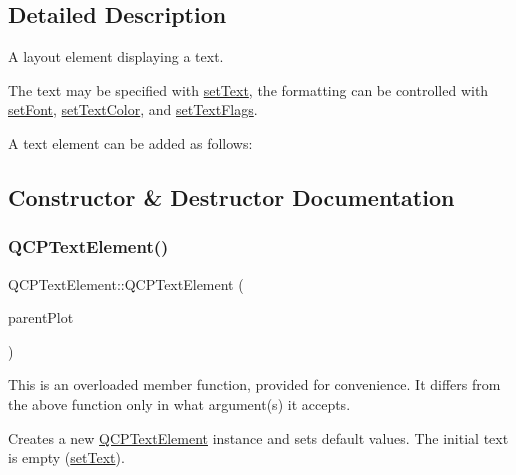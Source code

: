 \subsection{Detailed Description}
A layout element displaying a text. 

The text may be specified with \mbox{\hyperlink{class_q_c_p_text_element_ac44b81e69e719b879eb2feecb33557e2}{set\+Text}}, the formatting can be controlled with \mbox{\hyperlink{class_q_c_p_text_element_a09b3241769528fa87cb4bf35c97defad}{set\+Font}}, \mbox{\hyperlink{class_q_c_p_text_element_a4f3b8361c3ffb3f84346954929ce93ba}{set\+Text\+Color}}, and \mbox{\hyperlink{class_q_c_p_text_element_ab908f437f552020888a3ad8cf8242605}{set\+Text\+Flags}}.

A text element can be added as follows\+: 
\begin{DoxyCodeInclude}
\end{DoxyCodeInclude}


\subsection{Constructor \& Destructor Documentation}
\mbox{\label{class_q_c_p_text_element_ae1de18bdb1e7ba959f132018dd9a0258}} 
\subsubsection{\texorpdfstring{Q\+C\+P\+Text\+Element()}{QCPTextElement()}\hspace{0.1cm}{\footnotesize\ttfamily [1/5]}}
{\footnotesize\ttfamily Q\+C\+P\+Text\+Element\+::\+Q\+C\+P\+Text\+Element (\begin{DoxyParamCaption}\item[{\mbox{\hyperlink{class_q_custom_plot}{Q\+Custom\+Plot}} $\ast$}]{parent\+Plot }\end{DoxyParamCaption})\hspace{0.3cm}{\ttfamily [explicit]}}

This is an overloaded member function, provided for convenience. It differs from the above function only in what argument(s) it accepts.

Creates a new \mbox{\hyperlink{class_q_c_p_text_element}{Q\+C\+P\+Text\+Element}} instance and sets default values. The initial text is empty (\mbox{\hyperlink{class_q_c_p_text_element_ac44b81e69e719b879eb2feecb33557e2}{set\+Text}}). \mbox{\label{class_q_c_p_text_element_a00f08a8a3363ad8d7d12ca0db4922b6b}} 
